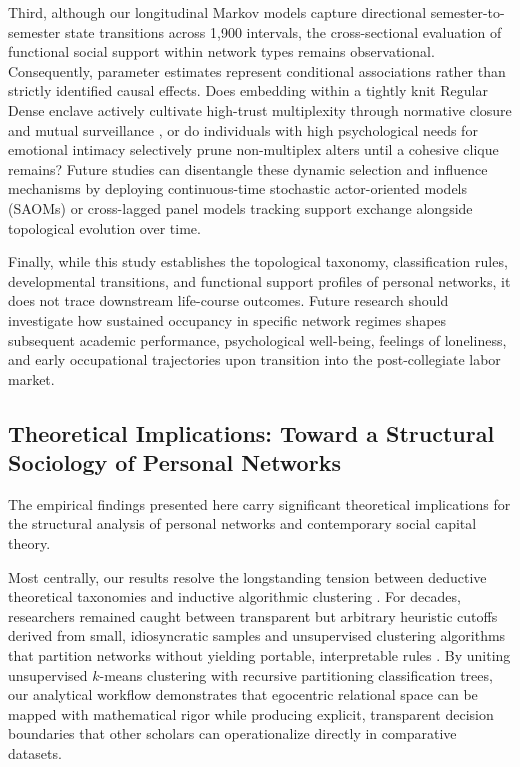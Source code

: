\documentclass[12pt]{article}
\begin{document}
Third, although our longitudinal Markov models capture directional semester-to-semester state transitions across 1,900 intervals, the cross-sectional evaluation of functional social support within network types remains observational. Consequently, parameter estimates represent conditional associations rather than strictly identified causal effects. Does embedding within a tightly knit Regular Dense enclave actively cultivate high-trust multiplexity through normative closure and mutual surveillance \citep{coleman1988social}, or do individuals with high psychological needs for emotional intimacy selectively prune non-multiplex alters until a cohesive clique remains? Future studies can disentangle these dynamic selection and influence mechanisms by deploying continuous-time stochastic actor-oriented models (SAOMs) or cross-lagged panel models tracking support exchange alongside topological evolution over time.

Finally, while this study establishes the topological taxonomy, classification rules, developmental transitions, and functional support profiles of personal networks, it does not trace downstream life-course outcomes. Future research should investigate how sustained occupancy in specific network regimes shapes subsequent academic performance, psychological well-being, feelings of loneliness, and early occupational trajectories upon transition into the post-collegiate labor market.

\subsection{Theoretical Implications: Toward a Structural Sociology of Personal Networks}

The empirical findings presented here carry significant theoretical implications for the structural analysis of personal networks and contemporary social capital theory.

Most centrally, our results resolve the longstanding tension between deductive theoretical taxonomies and inductive algorithmic clustering \citep{bidart2018personal, gonzalezcasado2024towards, vacca2020structure}. For decades, researchers remained caught between transparent but arbitrary heuristic cutoffs derived from small, idiosyncratic samples \citep{bidart2018personal} and unsupervised clustering algorithms that partition networks without yielding portable, interpretable rules \citep{vacca2020structure}. By uniting unsupervised $k$-means clustering with recursive partitioning classification trees, our analytical workflow demonstrates that egocentric relational space can be mapped with mathematical rigor while producing explicit, transparent decision boundaries that other scholars can operationalize directly in comparative datasets.
\end{document}
